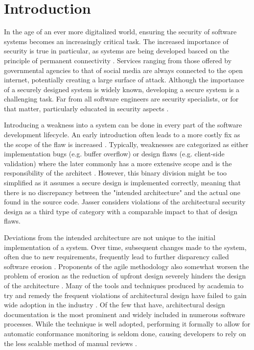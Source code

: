 \chapter{Introduction}
In the age of an ever more digitalized world, ensuring the security of software systems becomes an increasingly critical task. The increased importance of security is true in particular, as systems are being developed basced on the principle of permanent connectivity \cite{felderer_security_2016}.  Services ranging from those offered by governmental agencies to that of social media are always connected to the open internet, potentially creating a large surface of attack. Although the importance of a securely designed system is widely known, developing a secure system is a challenging task. Far from all software engineers are security specialists, or for that matter, particularly educated in security aspects \cite{yoshioka_survey_2008}.

Introducing a weakness into a system can be done in every part of the software development lifecycle. An early introduction often leads to a more costly fix as the scope of the flaw is increased \cite{mcgraw_software_2004}. Typically, weaknesses are categorized as either implementation bugs (e.g. buffer overflow) or design flaws (e.g. client-side validation) where the later commonly has a more extensive scope and is the responsibility of the architect \cite{arce_avoiding_2014}. However, this binary division might be too simplified as it assumes a secure design is implemented correctly, meaning that there is no discrepancy between the "intended architecture" and the actual one found in the source code. Jasser \cite{franch_constraining_2019} considers violations of the architectural security design as a third type of category with a comparable impact to that of design flaws.

Deviations from the intended architecture are not unique to the initial implementation of a system. Over time, subsequent changes made to the system, often due to new requirements, frequently lead to further disparency called software erosion \cite{de_silva_controlling_2012}. Proponents of the agile methodology also somewhat worsen the problem of erosion as the reduction of upfront design severely hinders the design of the architecture \cite{van_gurp_design_2002}. Many of the tools and techniques produced by academia to try and remedy the frequent violations of architectural design have failed to gain wide adoption in the industry \cite{de_silva_controlling_2012}.  Of the few that have, architectural design documentation is the most prominent and widely included in numerous software processes. While the technique is well adopted, performing it formally to allow for automatic conformance monitoring is seldom done, causing developers to rely on the less scalable method of manual reviews \cite{de_silva_controlling_2012}.

